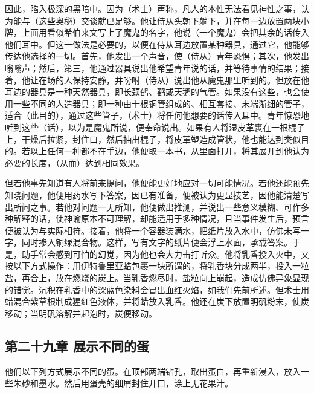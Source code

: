 因此，陷入极深的黑暗中。因为（术士）声称，凡人的本性无法看见神性之事，认为能与（这些奥秘）交谈就已足够。他让侍从头朝下躺下，并在每一边放置两块小牌，上面用看似希伯来文写上了魔鬼的名字，他说（一个魔鬼）会把其余的话传入他们耳中。但这一做法是必要的，以便在侍从耳边放置某种器具，通过它，他能够传达他选择的一切。首先，他发出一个声音，使（侍从）青年恐惧；其次，他发出嗡嗡声；然后，第三，他通过器具说出他希望青年说的话，并等待事情的结果；接着，他让在场的人保持安静，并吩咐（侍从）说出他从魔鬼那里听到的。但放在他耳边的器具是一种天然器具，即长颈鹤、鹳或天鹅的气管。如果没有这些，也会使用一些不同的人造器具；即一种由十根铜管组成的、相互套接、末端渐细的管子，适合（此目的），通过这些管子，（术士）将任何他想要的话传入耳中。青年惊恐地听到这些（话），以为是魔鬼所说，便奉命说出。如果有人将湿皮革裹在一根棍子上，干燥后拉紧，封住口，然后抽出棍子，将皮革塑造成管状，他也能达到类似目的。若以上任何一种都不在手边，他便取一本书，从里面打开，将其展开到他认为必要的长度，（从而）达到相同效果。\par

但若他事先知道有人将前来提问，他便能更好地应对一切可能情况。若他还能预先知晓问题，他便用药水写下答案，因已有准备，便被认为更显技艺，因他能清楚写出所问之事。若他对问题一无所知，他便做出推测，并说出一些意义模糊、可作多种解释的话，使神谕原本不可理解，却能适用于多种情况，且当事件发生后，预言便被认为与实际相符。接着，他将一个容器装满水，把纸片放入水中，仿佛未写一字，同时掺入铜绿混合物。这样，写有文字的纸片便会浮上水面，承载答案。于是，助手常会感到可怕的幻觉，因为他也会大力击打听众。他将乳香投入火中，又按以下方式操作：用伊特鲁里亚蜡包裹一块所谓的，将乳香块分成两半，投入一粒盐，再合上，放在燃烧的炭上。当乳香燃尽时，盐粒向上崩起，造成仿佛异象显现的错觉。沉积在乳香中的深蓝色染料会冒出血红火焰，如我们先前所述。但术士用蜡混合紫草根制成猩红色液体，并将蜡放入乳香。他还在炭下放置明矾粉末，使炭移动；当明矾溶解并起泡时，炭便移动。\par


\subsection{第二十九章 展示不同的蛋}

他们以下列方式展示不同的蛋。在顶部两端钻孔，取出蛋白，再重新浸入，放入一些朱砂和墨水。然后用蛋壳的细屑封住开口，涂上无花果汁。\par


